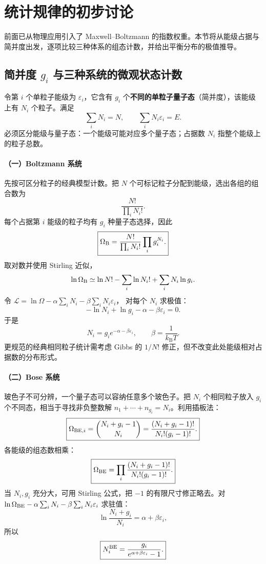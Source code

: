 \documentclass[11pt,a4paper,openany]{ctexbook}
\newcommand{\kb}{k_{\mathrm B}}
\begin{document}
\section{统计规律的初步讨论}
前面已从物理应用引入了 Maxwell--Boltzmann 的指数权重。本节将从能级占据与简并度出发，逐项比较三种体系的组态计数，并给出平衡分布的极值推导。

\subsection*{简并度 $g_i$ 与三种系统的微观状态计数}
令第 $i$ 个单粒子能级为 $\varepsilon_i$，它含有 $g_i$ 个\textbf{不同的单粒子量子态}（简并度），该能级上有 $N_i$ 个粒子。满足
\[
\sum_iN_i=N,\qquad \sum_iN_i\varepsilon_i=E.
\]
必须区分能级与量子态：一个能级可能对应多个量子态；占据数 $N_i$ 指整个能级上的粒子总数。

\paragraph{（一）Boltzmann 系统}
先按可区分粒子的经典模型计数。把 $N$ 个可标记粒子分配到能级，选出各组的组合数为
\[
\frac{N!}{\prod_iN_i!}.
\]
每个占据第 $i$ 能级的粒子均有 $g_i$ 种量子态选择，因此
\[
\boxed{\Omega_{\rm B}
=\frac{N!}{\prod_iN_i!}\prod_i g_i^{N_i}.}
\]
取对数并使用 Stirling 近似，
\[
\ln\Omega_{\rm B}\simeq \ln N!-\sum_i\ln N_i!
+\sum_iN_i\ln g_i.
\]
令 $\mathcal L=\ln\Omega-\alpha\sum_iN_i-\beta\sum_iN_i\varepsilon_i$，
对每个 $N_i$ 求极值：
\[
-\ln N_i+\ln g_i-\alpha-\beta\varepsilon_i=0.
\]
于是
\[
\boxed{N_i=g_i e^{-\alpha-\beta\varepsilon_i}},\qquad
\beta=\frac1{\kb T}.
\]
更规范的经典相同粒子统计需考虑 Gibbs 的 $1/N!$ 修正，但不改变此处能级相对占据数的分布形式。

\paragraph{（二）Bose 系统}
玻色子不可分辨，一个量子态可以容纳任意多个玻色子。把 $N_i$ 个相同粒子放入 $g_i$ 个不同态，相当于寻找非负整数解
$n_1+\cdots+n_{g_i}=N_i$。利用插板法：
\[
\boxed{\Omega_{{\rm BE},i}
=\binom{N_i+g_i-1}{N_i}
=\frac{(N_i+g_i-1)!}{N_i!(g_i-1)!}.}
\]
各能级的组态数相乘：
\[
\boxed{\Omega_{\rm BE}=\prod_i
\frac{(N_i+g_i-1)!}{N_i!(g_i-1)!}.}
\]
当 $N_i,g_i$ 充分大，可用 Stirling 公式，把 $-1$ 的有限尺寸修正略去。对
$\ln\Omega_{\rm BE}-\alpha\sum_iN_i-\beta\sum_iN_i\varepsilon_i$
求驻值：
\[
\ln\frac{N_i+g_i}{N_i}=\alpha+\beta\varepsilon_i,
\]
所以
\[
\boxed{N_i^{\rm BE}
=\frac{g_i}{e^{\alpha+\beta\varepsilon_i}-1}.}
\]
\end{document}

